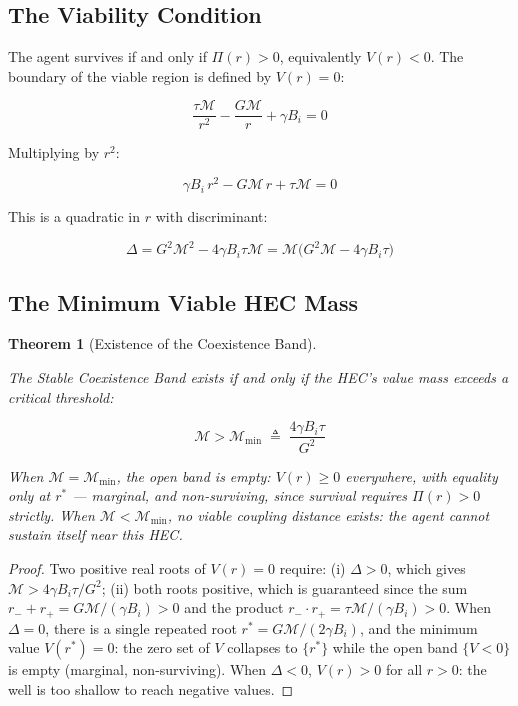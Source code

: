 \documentclass[11pt]{article}
\theoremstyle{plain}
\newtheorem{theorem}{Theorem}
\theoremstyle{definition}
\theoremstyle{remark}
\let\origsubsection\subsection
\renewcommand{\subsection}{\needspace{7\baselineskip}\origsubsection}
\begin{document}
\subsection{The Viability Condition}\label{the-viability-condition}

The agent survives if and only if \(\Pi(r) > 0\), equivalently
\(V(r) < 0\). The boundary of the viable region is defined by
\(V(r) = 0\):

\[\frac{\tau \mathcal{M}}{r^2} - \frac{G \mathcal{M}}{r} + \gamma B_i = 0\]

Multiplying by \(r^2\):

\[\gamma B_i \, r^2 - G\mathcal{M} \, r + \tau\mathcal{M} = 0\]

This is a quadratic in \(r\) with discriminant:

\[\Delta = G^2 \mathcal{M}^2 - 4\gamma B_i \tau \mathcal{M} = \mathcal{M}\bigl(G^2 \mathcal{M} - 4\gamma B_i \tau\bigr)\]

\subsection{The Minimum Viable HEC
Mass}\label{the-minimum-viable-hec-mass}

\begin{theorem}[Existence of the Coexistence Band]
\label{thm-existence-coexistence-band}

The Stable Coexistence Band exists if and only if the HEC's value mass exceeds a critical threshold:

$$\mathcal{M} > \mathcal{M}_{\min} \;\triangleq\; \frac{4\gamma B_i \tau}{G^2}$$

When $\mathcal{M} = \mathcal{M}_{\min}$, the open band is empty: $V(r) \geq 0$ everywhere, with equality only at $r^*$ — marginal, and non-surviving, since survival requires $\Pi(r) > 0$ strictly. When $\mathcal{M} < \mathcal{M}_{\min}$, no viable coupling distance exists: the agent cannot sustain itself near this HEC.
\end{theorem}

\begin{proof}
Two positive real roots of $V(r) = 0$ require: (i) $\Delta > 0$, which gives $\mathcal{M} > 4\gamma B_i \tau / G^2$; (ii) both roots positive, which is guaranteed since the sum $r_- + r_+ = G\mathcal{M}/(\gamma B_i) > 0$ and the product $r_- \cdot r_+ = \tau\mathcal{M}/(\gamma B_i) > 0$. When $\Delta = 0$, there is a single repeated root $r^* = G\mathcal{M}/(2\gamma B_i)$, and the minimum value $V(r^*) = 0$: the zero set of $V$ collapses to $\{r^*\}$ while the open band $\{V < 0\}$ is empty (marginal, non-surviving). When $\Delta < 0$, $V(r) > 0$ for all $r > 0$: the well is too shallow to reach negative values.
\end{proof}
\end{document}
